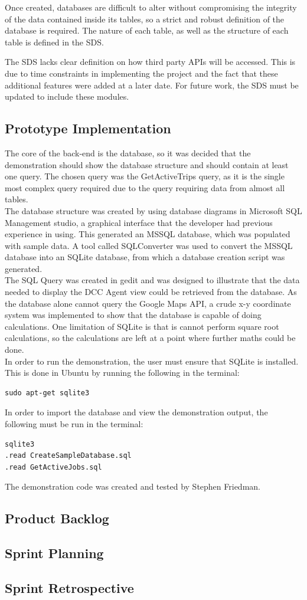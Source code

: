 \documentclass[12pt]{article}
\begin{document}
Once created, databases are difficult to alter without compromising the integrity of the data contained inside its tables, so a strict and robust definition of the database is required. The nature of each table, as well as the structure of each table is defined in the SDS.

The SDS lacks clear definition on how third party APIs will be accessed. This is due to time constraints in implementing the project and the fact that these additional features were added at a later date. For future work, the SDS must be updated to include these modules.
\subsection{Prototype Implementation}
The core of the back-end is the database, so it was decided that the demonstration should show the database structure and should contain at least one query. The chosen query was the GetActiveTrips query, as it is the single most complex query required due to the query requiring data from almost all tables.\\

The database structure was created by using database diagrams in Microsoft SQL Management studio, a graphical interface that the developer had previous experience in using. This generated an MSSQL database, which was populated with sample data. A tool called SQLConverter was used to convert the MSSQL database into an SQLite database, from which a database creation script was generated.\\

The SQL Query was created in gedit and was designed to illustrate that the data needed to display the DCC Agent view could be retrieved from the database. As the database alone cannot query the Google Maps API, a crude x-y coordinate system was implemented to show that the database is capable of doing calculations. One limitation of SQLite is that is cannot perform square root calculations, so the calculations are left at a point where further maths could be done. \\

In order to run the demonstration, the user must ensure that SQLite is installed. This is done in Ubuntu by running the following in the terminal:
\begin{verbatim}
sudo apt-get sqlite3
\end{verbatim}
In order to import the database and view the demonstration output, the following must be run in the terminal:
\begin{verbatim}
sqlite3
.read CreateSampleDatabase.sql
.read GetActiveJobs.sql
\end{verbatim}

The demonstration code was created and tested by Stephen Friedman.

\subsection{Product Backlog}

\subsection{Sprint Planning}
\subsection{Sprint Retrospective}
\end{document}
